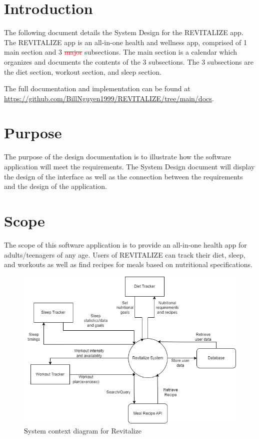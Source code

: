 \documentclass[12pt, titlepage]{article}
\begin{document}
\newpage

\tableofcontents

\newpage

\listoftables

\listoffigures

\newpage


\section{Introduction}
The following document details the System Design for
the REVITALIZE app. The REVITALIZE app is an all-in-one health and wellness app, comprised of 1 main 
section and 3 {\textcolor{red}{\sout{major}}} subsections. The main section is a calendar which organizes and documents the contents of the 3 subsections. 
The 3 subsections are the diet section, workout section, and sleep section.

The full documentation and implementation can be
found at \url{https://github.com/BillNguyen1999/REVITALIZE/tree/main/docs}.


\section{Purpose}

The purpose of the design documentation is to illustrate how the software application will meet the requirements. The System Design document will display the design of the interface as well as the connection between the requirements and the design of the application. 


\section{Scope}

The scope of this software application is to provide an all-in-one health app for adults/teenagers of any age. Users of REVITALIZE can track their diet, sleep, and workouts as well as find recipes for meals based on nutritional specifications. 
\begin{figure}[H]
	\centering
	\includegraphics[scale=0.5]{system_diagrams/SystemContextDiagram.png}
	\caption{\textcolor{black} System context diagram for Revitalize}
\end{figure}
\end{document}
